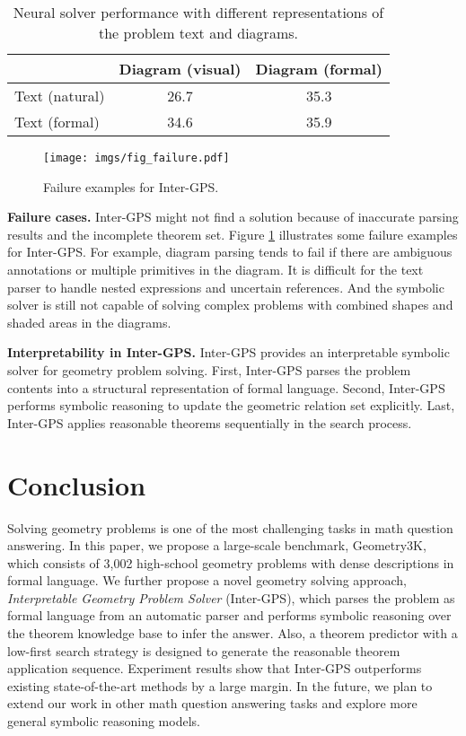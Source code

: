 \documentclass[11pt,a4paper]{article}
\begin{document}
\begin{table}[ht]
\centering 
\setlength{\tabcolsep}{3pt}
\small 
\begin{tabular}{l|c|c}
	\hline
	 & Diagram (visual) & Diagram (formal)  \\
	 \hline
	 Text (natural) & 26.7 & 35.3  \\
	 \hline
	 Text (formal)  &  34.6 & 35.9 \\
	\hline
\end{tabular}
\caption{Neural solver performance with different representations of the problem text and diagrams.}
\label{res_table:nn_solvers}
\end{table}

\begin{figure}[t]
    \centering 
    \texttt{[image: imgs/fig\_failure.pdf]}
\caption{Failure examples for  Inter-GPS.}
    \label{fig:failure}
\end{figure}

\noindent \textbf{Failure cases.} Inter-GPS might not find a solution because of inaccurate parsing results and the incomplete theorem set. Figure \ref{fig:failure} illustrates some failure examples for Inter-GPS. For example, diagram parsing tends to fail if there are ambiguous annotations or multiple primitives in the diagram. It is difficult for the text parser to handle nested expressions and uncertain references. And the symbolic solver is still not capable of solving complex problems with combined shapes and shaded areas in the diagrams.

\noindent \textbf{Interpretability in Inter-GPS.} Inter-GPS provides an interpretable symbolic solver for geometry problem solving. First, Inter-GPS parses the problem contents into a structural representation of formal language. Second, Inter-GPS performs symbolic reasoning to update the geometric relation set explicitly. Last, Inter-GPS applies reasonable theorems sequentially in the search process.

\section{Conclusion}
Solving geometry problems is one of the most challenging tasks in math question answering. In this paper, we propose a large-scale benchmark, Geometry3K, which consists of 3,002 high-school geometry problems with dense descriptions in formal language. We further propose a novel geometry solving approach, \textit{Interpretable  Geometry Problem Solver} (Inter-GPS), which parses the problem as formal language from an automatic parser and performs symbolic reasoning over the theorem knowledge base to infer the answer. Also, a theorem predictor with a low-first search strategy is designed to generate the reasonable theorem application sequence. Experiment results show that Inter-GPS outperforms existing state-of-the-art methods by a large margin. In the future, we plan to extend our work in other math question answering tasks and explore more general symbolic reasoning models.
\end{document}
